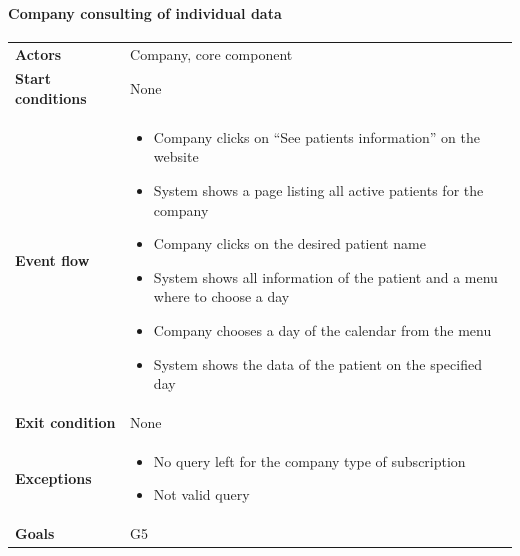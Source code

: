 \paragraph{Company consulting of individual data}
\begin{center}
\begin{table}[H]
\centering
\begin{tabular}{l|p{}}
\textbf{Actors} & Company, core component \\
\textbf{Start conditions} & None \\
\textbf{Event flow}  & 
\begin{minipage}[t]{0.7\textwidth}
    \begin{itemize}
        \item Company clicks on “See patients information” on the website

\item System shows a page listing all active patients for the company

\item Company clicks on the desired patient name

\item System shows all information of the patient and a menu where to choose a day 

\item Company chooses a day of the calendar from the menu
\item System shows the data of the patient on the specified day

    \end{itemize}
    
\end{minipage}\\
\textbf{Exit condition} & None \\
\textbf{Exceptions} & \begin{minipage}[t]{0.7\textwidth}
    \begin{itemize}
       \item No query left for the company type of subscription
        \item Not valid query

    \end{itemize}
    
\end{minipage} \\
\textbf{Goals} & G5 
\end{tabular}

\end{table}
\end{center}
